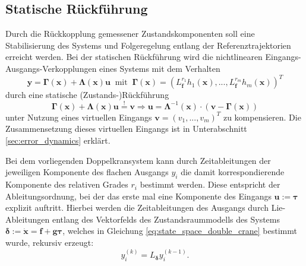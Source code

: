\subsection{Statische Rückführung}
\label{sec:static_state_feedback}
Durch die Rückkopplung gemessener Zustandskomponenten soll eine Stabilisierung des Systems und Folgeregelung entlang der Referenztrajektorien erreicht werden. Bei der statischen Rückführung wird die nichtlinearen Eingangs-Ausgangs-Verkopplungen eines Systems mit dem Verhalten
\begin{equation}
	\mathbf{y} = \boldsymbol{\Gamma}(\mathbf{x}) + \boldsymbol{\Lambda}(\mathbf{x}) \mathbf{u} \ \text{ mit } \ \boldsymbol{\Gamma}(\mathbf{x}) = (L_{\mathbf{f}}^{r_1} h_1(\mathbf{x}), ..., L_{\mathbf{f}}^{r_m} h_m(\mathbf{x}))^T
\end{equation}
durch eine statische (Zustands-)Rückführung
\begin{equation}
	\label{eq:static_state_feedback}
	\boldsymbol{\Gamma}(\mathbf{x}) + \boldsymbol{\Lambda}(\mathbf{x}) \mathbf{u} \stackrel{!}{=} \mathbf{v} \Rightarrow \mathbf{u} = \boldsymbol{\Lambda}^{-1}(\mathbf{x}) \cdot (\mathbf{v} - \boldsymbol{\Gamma}(\mathbf{x}))
\end{equation}
unter Nutzung eines virtuellen Eingangs $\mathbf{v} = (v_1, ..., v_m)^T$ zu kompensieren. Die Zusammensetzung dieses virtuellen Eingangs ist in Unterabschnitt \ref{sec:error_dynamics} erklärt. \cite[S. 195]{NLRT_Roebenack}

Bei dem vorliegenden Doppelkransystem kann durch Zeitableitungen der jeweiligen Komponente des flachen Ausgangs $y_i$ die damit korrespondierende Komponente des relativen Grades $r_i$ bestimmt werden. Diese entspricht der Ableitungsordnung, bei der das erste mal eine Komponente des Eingangs $\mathbf{u}:=\boldsymbol{\tau}$ explizit auftritt. Hierbei werden die Zeitableitungen des Ausgangs durch Lie-Ableitungen entlang des Vektorfelds des Zustandsraummodells des Systems $\boldsymbol{\delta} := \dot{\mathbf{x}} = \mathbf{f} + \mathbf{g} \boldsymbol{\tau}$, welches in Gleichung \eqref{eq:state_space_double_crane} bestimmt wurde, rekursiv erzeugt: 
\begin{equation}
	\label{eq:Lie_time_deriv}
	y_i^{(k)} = L_{\boldsymbol{\delta}} y_i^{(k-1)} .
\end{equation}

